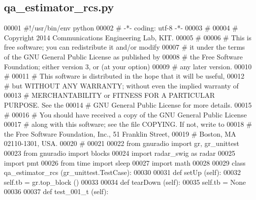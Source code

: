 \subsection{qa\+\_\+estimator\+\_\+rcs.\+py}
\label{qa__estimator__rcs_8py_source}

\begin{DoxyCode}
00001 \textcolor{comment}{#!/usr/bin/env python}
00002 \textcolor{comment}{# -*- coding: utf-8 -*-}
00003 \textcolor{comment}{# }
00004 \textcolor{comment}{# Copyright 2014 Communications Engineering Lab, KIT.}
00005 \textcolor{comment}{# }
00006 \textcolor{comment}{# This is free software; you can redistribute it and/or modify}
00007 \textcolor{comment}{# it under the terms of the GNU General Public License as published by}
00008 \textcolor{comment}{# the Free Software Foundation; either version 3, or (at your option)}
00009 \textcolor{comment}{# any later version.}
00010 \textcolor{comment}{# }
00011 \textcolor{comment}{# This software is distributed in the hope that it will be useful,}
00012 \textcolor{comment}{# but WITHOUT ANY WARRANTY; without even the implied warranty of}
00013 \textcolor{comment}{# MERCHANTABILITY or FITNESS FOR A PARTICULAR PURPOSE.  See the}
00014 \textcolor{comment}{# GNU General Public License for more details.}
00015 \textcolor{comment}{# }
00016 \textcolor{comment}{# You should have received a copy of the GNU General Public License}
00017 \textcolor{comment}{# along with this software; see the file COPYING.  If not, write to}
00018 \textcolor{comment}{# the Free Software Foundation, Inc., 51 Franklin Street,}
00019 \textcolor{comment}{# Boston, MA 02110-1301, USA.}
00020 \textcolor{comment}{# }
00021 
00022 \textcolor{keyword}{from} gnuradio \textcolor{keyword}{import} gr, gr\_unittest
00023 \textcolor{keyword}{from} gnuradio \textcolor{keyword}{import} blocks
00024 \textcolor{keyword}{import} radar\_swig \textcolor{keyword}{as} radar
00025 \textcolor{keyword}{import} pmt
00026 \textcolor{keyword}{from} time \textcolor{keyword}{import} sleep
00027 \textcolor{keyword}{import} math
00028 
00029 \textcolor{keyword}{class }qa_estimator_rcs (gr\_unittest.TestCase):
00030 
00031     \textcolor{keyword}{def }setUp (self):
00032         self.tb = gr.top\_block ()
00033 
00034     \textcolor{keyword}{def }tearDown (self):
00035         self.tb = \textcolor{keywordtype}{None}
00036 
00037     \textcolor{keyword}{def }test_001_t (self):

\end{DoxyCode}
